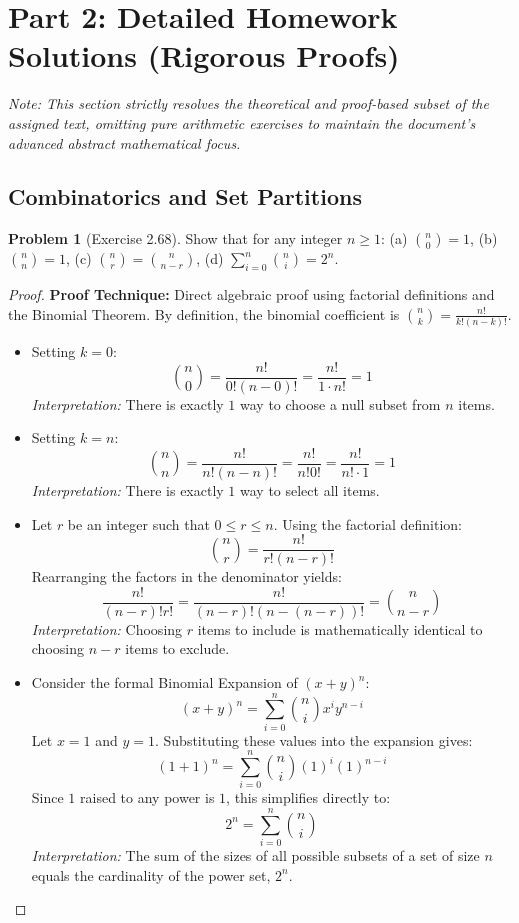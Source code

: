\documentclass[11pt, letterpaper]{article}
\theoremstyle{definition}
\newtheorem{problem}{Problem}
\begin{document}
\newpage
\section{Part 2: Detailed Homework Solutions (Rigorous Proofs)}
\textit{Note: This section strictly resolves the theoretical and proof-based subset of the assigned text, omitting pure arithmetic exercises to maintain the document's advanced abstract mathematical focus.}

\subsection{Combinatorics and Set Partitions}

\begin{problem}[Exercise 2.68]
Show that for any integer $n \geq 1$:
(a) $\binom{n}{0} = 1$, (b) $\binom{n}{n} = 1$, (c) $\binom{n}{r} = \binom{n}{n-r}$, (d) $\sum_{i=0}^n \binom{n}{i} = 2^n$.
\end{problem}
\begin{proof}
\textbf{Proof Technique:} Direct algebraic proof using factorial definitions and the Binomial Theorem.
By definition, the binomial coefficient is $\binom{n}{k} = \frac{n!}{k!(n-k)!}$.
\begin{itemize}
    \item[\textbf{(a)}] Setting $k = 0$:
    \[ \binom{n}{0} = \frac{n!}{0!(n-0)!} = \frac{n!}{1 \cdot n!} = 1 \]
    \textit{Interpretation:} There is exactly $1$ way to choose a null subset from $n$ items.
    
    \item[\textbf{(b)}] Setting $k = n$:
    \[ \binom{n}{n} = \frac{n!}{n!(n-n)!} = \frac{n!}{n!0!} = \frac{n!}{n! \cdot 1} = 1 \]
    \textit{Interpretation:} There is exactly $1$ way to select all items.
    
    \item[\textbf{(c)}] Let $r$ be an integer such that $0 \leq r \leq n$. Using the factorial definition:
    \[ \binom{n}{r} = \frac{n!}{r!(n-r)!} \]
    Rearranging the factors in the denominator yields:
    \[ \frac{n!}{(n-r)!r!} = \frac{n!}{(n-r)!(n - (n-r))!} = \binom{n}{n-r} \]
    \textit{Interpretation:} Choosing $r$ items to include is mathematically identical to choosing $n-r$ items to exclude.
    
    \item[\textbf{(d)}] Consider the formal Binomial Expansion of $(x+y)^n$:
    \[ (x+y)^n = \sum_{i=0}^n \binom{n}{i} x^i y^{n-i} \]
    Let $x = 1$ and $y = 1$. Substituting these values into the expansion gives:
    \[ (1+1)^n = \sum_{i=0}^n \binom{n}{i} (1)^i (1)^{n-i} \]
    Since $1$ raised to any power is $1$, this simplifies directly to:
    \[ 2^n = \sum_{i=0}^n \binom{n}{i} \]
    \textit{Interpretation:} The sum of the sizes of all possible subsets of a set of size $n$ equals the cardinality of the power set, $2^n$.
\end{itemize}
\end{proof}
\end{document}
